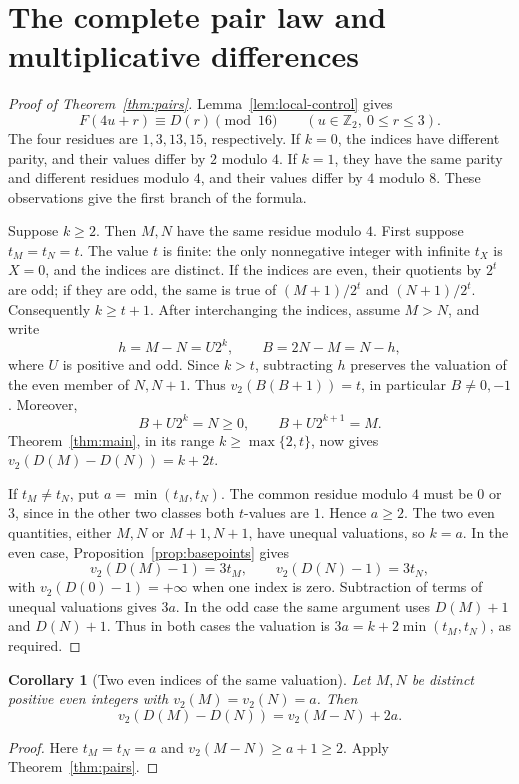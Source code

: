 \documentclass[11pt]{article}
\newtheorem{corollary}[theorem]{Corollary}
\theoremstyle{remark}\newtheorem{remark}[theorem]{Remark}
\newcommand{\Ztwo}{\mathbb Z_2}\newcommand{\Qtwo}{\mathbb Q_2}
\begin{document}
\section{The complete pair law and multiplicative differences}
\begin{proof}[Proof of Theorem~\ref{thm:pairs}]
Lemma~\ref{lem:local-control} gives
\[
 F(4u+r)\equiv D(r)\pmod{16}
 \qquad(u\in\Ztwo,\ 0\le r\le3).
\]
The four residues are $1,3,13,15$, respectively. If $k=0$, the
indices have different parity, and their values differ by $2$ modulo
$4$. If $k=1$, they have the same parity and different residues modulo
$4$, and their values differ by $4$ modulo $8$. These observations give
the first branch of the formula.

Suppose $k\ge2$. Then $M,N$ have the same residue modulo $4$.
First suppose $t_M=t_N=t$. The value $t$ is finite: the only
nonnegative integer with infinite $t_X$ is $X=0$, and the indices are
distinct. If the indices are even, their quotients by $2^t$ are odd;
if they are odd, the same is true of $(M+1)/2^t$ and $(N+1)/2^t$.
Consequently $k\ge t+1$. After interchanging the indices, assume
$M>N$, and write
\[
 h=M-N=U2^k,\qquad B=2N-M=N-h,
\]
where $U$ is positive and odd. Since $k>t$, subtracting $h$ preserves
the valuation of the even member of $N,N+1$. Thus
$v_2(B(B+1))=t$, in particular $B\ne0,-1$. Moreover,
\[
 B+U2^k=N\ge0,\qquad B+U2^{k+1}=M.
\]
Theorem~\ref{thm:main}, in its range $k\ge\max\{2,t\}$, now gives
$v_2(D(M)-D(N))=k+2t$.

If $t_M\ne t_N$, put $a=\min(t_M,t_N)$. The common residue modulo
$4$ must be $0$ or $3$, since in the other two classes both $t$-values
are $1$. Hence $a\ge2$. The two even quantities, either $M,N$ or
$M+1,N+1$, have unequal valuations, so $k=a$. In the even case,
Proposition~\ref{prop:basepoints} gives
\[
 v_2(D(M)-1)=3t_M,\qquad v_2(D(N)-1)=3t_N,
\]
with $v_2(D(0)-1)=+\infty$ when one index is zero. Subtraction of
terms of unequal valuations gives $3a$. In the odd case the same
argument uses $D(M)+1$ and $D(N)+1$. Thus in both cases the valuation
is $3a=k+2\min(t_M,t_N)$, as required.
\end{proof}


\begin{corollary}[Two even indices of the same valuation]\label{cor:two-point}
Let $M,N$ be distinct positive even integers with
$v_2(M)=v_2(N)=a$. Then
\[
 v_2(D(M)-D(N))=v_2(M-N)+2a.
\]
\end{corollary}
\begin{proof}
Here $t_M=t_N=a$ and $v_2(M-N)\ge a+1\ge2$.
Apply Theorem~\ref{thm:pairs}.
\end{proof}
\end{document}
